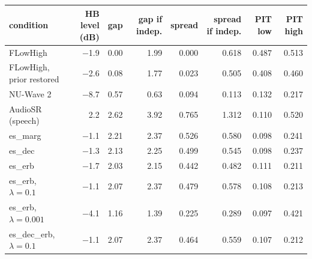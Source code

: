 \begin{tabular}{lrrrrrrr}
\toprule
condition & HB level (dB) & gap & gap if indep. & spread & spread if indep. & PIT low & PIT high \\
\midrule
FLowHigh & $-$1.9 & 0.00 & 1.99 & 0.000 & 0.618 & 0.487 & 0.513 \\
FLowHigh, prior restored & $-$2.6 & 0.08 & 1.77 & 0.023 & 0.505 & 0.408 & 0.460 \\
NU-Wave 2 & $-$8.7 & 0.57 & 0.63 & 0.094 & 0.113 & 0.132 & 0.217 \\
AudioSR (speech) & 2.2 & 2.62 & 3.92 & 0.765 & 1.312 & 0.110 & 0.520 \\
es\_marg & $-$1.1 & 2.21 & 2.37 & 0.526 & 0.580 & 0.098 & 0.241 \\
es\_dec & $-$1.3 & 2.13 & 2.25 & 0.499 & 0.545 & 0.098 & 0.237 \\
es\_erb & $-$1.7 & 2.03 & 2.15 & 0.442 & 0.482 & 0.111 & 0.211 \\
es\_erb, $\lambda{=}0.1$ & $-$1.1 & 2.07 & 2.37 & 0.479 & 0.578 & 0.108 & 0.213 \\
es\_erb, $\lambda{=}0.001$ & $-$4.1 & 1.16 & 1.39 & 0.225 & 0.289 & 0.097 & 0.421 \\
es\_dec\_erb, $\lambda{=}0.1$ & $-$1.1 & 2.07 & 2.37 & 0.464 & 0.559 & 0.107 & 0.212 \\
\bottomrule
\end{tabular}

